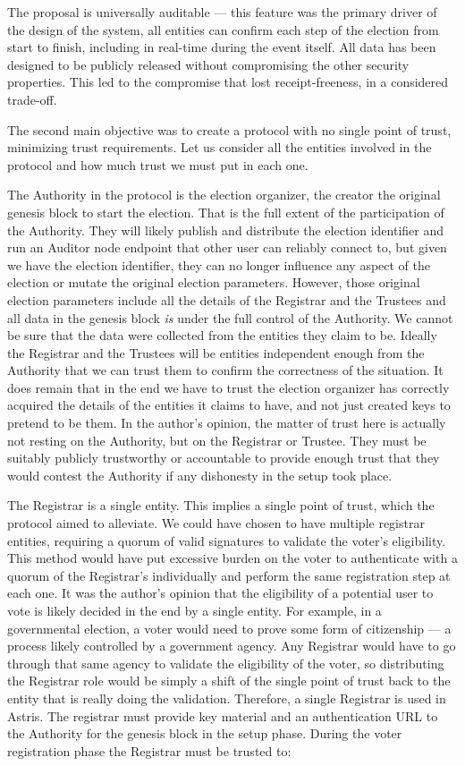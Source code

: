 The proposal is universally auditable --- this feature was the primary driver of the design of the system, all entities can confirm each step of the election from start to finish, including in real-time during the event itself. All data has been designed to be publicly released without compromising the other security properties. This led to the compromise that lost receipt-freeness, in a considered trade-off.

The second main objective was to create a protocol with no single point of trust, minimizing trust requirements. Let us consider all the entities involved in the protocol and how much trust we must put in each one.

The Authority in the protocol is the election organizer, the creator the original genesis block to start the election. That is the full extent of the participation of the Authority. They will likely publish and distribute the election identifier and run an Auditor node endpoint that other user can reliably connect to, but given we have the election identifier, they can no longer influence any aspect of the election or mutate the original election parameters. However, those original election parameters include all the details of the Registrar and the Trustees and all data in the genesis block \emph{is} under the full control of the Authority. We cannot be sure that the data were collected from the entities they claim to be. Ideally the Registrar and the Trustees will be entities independent enough from the Authority that we can trust them to confirm the correctness of the situation. It does remain that in the end we have to trust the election organizer has correctly acquired the details of the entities it claims to have, and not just created keys to pretend to be them. In the author's opinion, the matter of trust here is actually not resting on the Authority, but on the Registrar or Trustee. They must be suitably publicly trustworthy or accountable to provide enough trust that they would contest the Authority if any dishonesty in the setup took place.

The Registrar is a single entity. This implies a single point of trust, which the protocol aimed to alleviate. We could have chosen to have multiple registrar entities, requiring a quorum of valid signatures to validate the voter's eligibility. This method would have put excessive burden on the voter to authenticate with a quorum of the Registrar's individually and perform the same registration step at each one. It was the author's opinion that the eligibility of a potential user to vote is likely decided in the end by a single entity. For example, in a governmental election, a voter would need to prove some form of citizenship --- a process likely controlled by a government agency. Any Registrar would have to go through that same agency to validate the eligibility of the voter, so distributing the Registrar role would be simply a shift of the single point of trust back to the entity that is really doing the validation. Therefore, a single Registrar is used in Astris. The registrar must provide key material and an authentication URL to the Authority for the genesis block in the setup phase. During the voter registration phase the Registrar must be trusted to:

